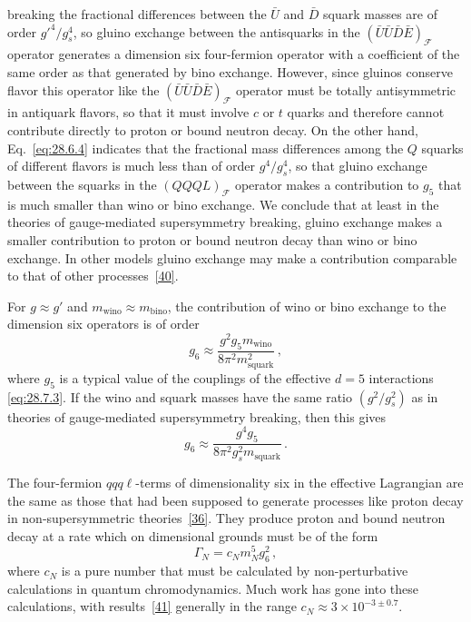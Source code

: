 breaking the fractional differences between the \(\bar U\) and \(\bar D\)
squark masses are of order \(g'^4/g_s^4\), so gluino exchange between the
antisquarks in the \((\bar U\bar U\bar D\bar E)_{\mathcal F}\) operator
generates a dimension six four-fermion operator with a coefficient of the
same order as that generated by bino exchange. However, since gluinos
conserve flavor this operator like the
\((\bar U\bar U\bar D\bar E)_{\mathcal F}\) operator must be totally
antisymmetric in antiquark flavors, so that it must involve \(c\) or \(t\)
quarks and therefore cannot contribute directly to proton or bound neutron
decay. On the other hand, Eq.~\eqref{eq:28.6.4} indicates that the
fractional mass differences among the \(Q\) squarks of different flavors is
much less than of order \(g^4/g_s^4\), so that gluino exchange between the
squarks in the \((QQQL)_{\mathcal F}\) operator makes a contribution to
\(g_5\) that is much smaller than wino or bino exchange. We conclude that
at least in the theories of gauge-mediated supersymmetry breaking, gluino
exchange makes a smaller contribution to proton or bound neutron decay than
wino or bino exchange. In other models gluino exchange may make a
contribution comparable to that of other
processes~\hyperref[ch28-ref-40]{[40]}.

For \(g\approx g'\) and \(m_{\mathrm{wino}}\approx m_{\mathrm{bino}}\),
the contribution of wino or bino exchange to the dimension six operators
is of order
\begin{equation}
  g_6\approx
  \frac{g^2g_5m_{\mathrm{wino}}}
       {8\pi^2m_{\mathrm{squark}}^2}\,,
  \tag{28.7.4}\label{eq:28.7.4}
\end{equation}
where \(g_5\) is a typical value of the couplings of the effective \(d=5\)
interactions \eqref{eq:28.7.3}. If the wino and squark masses have the same
ratio \((g^2/g_s^2)\) as in theories of gauge-mediated supersymmetry
breaking, then this gives
\begin{equation}
  g_6\approx
  \frac{g^4g_5}
       {8\pi^2g_s^2m_{\mathrm{squark}}}\,.
  \tag{28.7.5}\label{eq:28.7.5}
\end{equation}

The four-fermion \(qqq\ell\)-terms of dimensionality six in the effective
Lagrangian are the same as those that had been supposed to generate
processes like proton decay in non-supersymmetric
theories~\hyperref[ch28-ref-36]{[36]}. They produce proton
and bound neutron decay at a rate which on dimensional grounds must be of
the form
\begin{equation}
  \Gamma_N=c_Nm_N^5g_6^2\,,
  \tag{28.7.6}\label{eq:28.7.6}
\end{equation}
where \(c_N\) is a pure number that must be calculated by non-perturbative
calculations in quantum chromodynamics. Much work has gone into these
calculations, with results~\hyperref[ch28-ref-41]{[41]} generally in the range
\(c_N\approx 3\times10^{-3\pm0.7}\).

